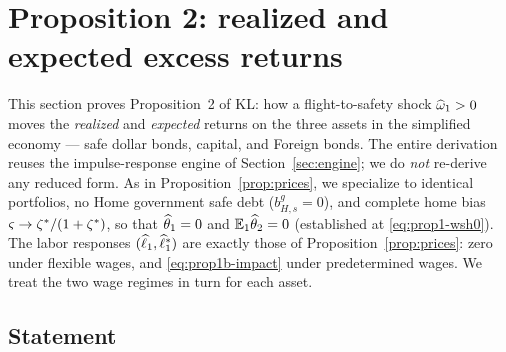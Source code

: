 \section{Proposition 2: realized and expected excess returns}
\label{sec:prop2}

This section proves Proposition~2 of KL: how a flight-to-safety shock
$\widehat{\omega}_1>0$ moves the \emph{realized} and \emph{expected} returns on the
three assets in the simplified economy --- safe dollar bonds, capital, and
Foreign bonds. The entire derivation reuses the impulse-response engine of
Section~\ref{sec:engine}; we do \emph{not} re-derive any reduced form. As in
Proposition~\ref{prop:prices}, we specialize to identical portfolios, no Home
government safe debt ($b^g_{H,s}=0$), and complete home bias
$\varsigma\to\zeta^{*}/(1+\zeta^{*})$, so that $\widehat{\theta}_1=0$ and $\mathbb{E}_1\widehat{\theta}_2=0$
(established at \eqref{eq:prop1-wsh0}). The labor responses
$(\widehat{\ell}_1,\widehat{\ell}^{*}_1)$ are exactly those of
Proposition~\ref{prop:prices}: zero under flexible wages, and
\eqref{eq:prop1b-impact} under predetermined wages. We treat the two wage
regimes in turn for each asset.

\subsection{Statement}

